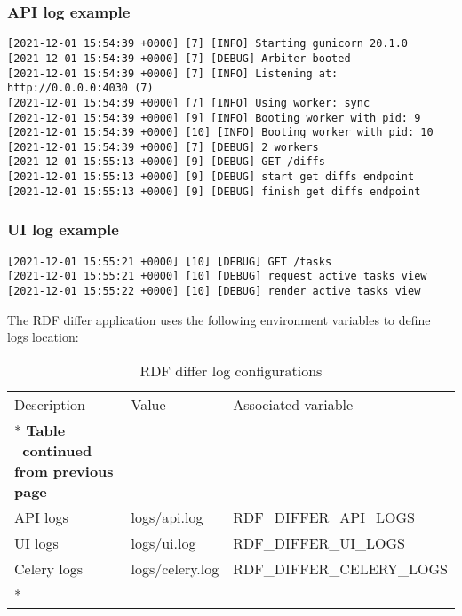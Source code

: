 \subsubsection{API log example}
\begin{lstlisting}
[2021-12-01 15:54:39 +0000] [7] [INFO] Starting gunicorn 20.1.0
[2021-12-01 15:54:39 +0000] [7] [DEBUG] Arbiter booted
[2021-12-01 15:54:39 +0000] [7] [INFO] Listening at: http://0.0.0.0:4030 (7)
[2021-12-01 15:54:39 +0000] [7] [INFO] Using worker: sync
[2021-12-01 15:54:39 +0000] [9] [INFO] Booting worker with pid: 9
[2021-12-01 15:54:39 +0000] [10] [INFO] Booting worker with pid: 10
[2021-12-01 15:54:39 +0000] [7] [DEBUG] 2 workers
[2021-12-01 15:55:13 +0000] [9] [DEBUG] GET /diffs
[2021-12-01 15:55:13 +0000] [9] [DEBUG] start get diffs endpoint
[2021-12-01 15:55:13 +0000] [9] [DEBUG] finish get diffs endpoint
\end{lstlisting}

\subsubsection{UI log example}
\begin{lstlisting}
[2021-12-01 15:55:21 +0000] [10] [DEBUG] GET /tasks
[2021-12-01 15:55:21 +0000] [10] [DEBUG] request active tasks view
[2021-12-01 15:55:22 +0000] [10] [DEBUG] render active tasks view
\end{lstlisting}

The RDF differ application uses the following environment variables to define logs location:

\begin{longtable}[c]{@{}p{3.5cm}p{3.5cm}l@{}}
	\toprule
	Description & Value           & Associated variable         \\* \midrule
	\endfirsthead
	\multicolumn{3}{c}%
	{{\bfseries Table \thetable\ continued from previous page}} \\
	\endhead
	\bottomrule
	\endfoot
	\endlastfoot
	API logs    & logs/api.log    & RDF\_DIFFER\_API\_LOGS      \\
	UI logs     & logs/ui.log     & RDF\_DIFFER\_UI\_LOGS       \\
	Celery logs & logs/celery.log & RDF\_DIFFER\_CELERY\_LOGS   \\* \bottomrule
	\caption{RDF differ log configurations}
	\label{tab:rdf-differ-log}                                  \\
\end{longtable}


